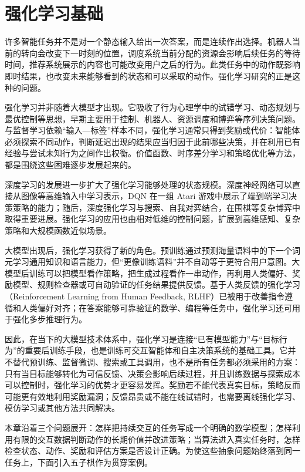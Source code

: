 
\chapter{强化学习基础}

许多智能任务并不是对一个静态输入给出一次答案，而是连续作出选择。机器人当前的转向会改变下一时刻的位置，调度系统当前分配的资源会影响后续任务的等待时间，推荐系统展示的内容也可能改变用户之后的行为。此类任务中的动作既影响即时结果，也改变未来能够看到的状态和可以采取的动作。强化学习研究的正是这种的问题。

强化学习并非随着大模型才出现。它吸收了行为心理学中的试错学习、动态规划与最优控制等思想，早期主要用于控制、机器人、资源调度和博弈等序列决策问题。与监督学习依赖“输入—标签”样本不同，强化学习通常只得到奖励或代价：智能体必须探索不同动作，判断延迟出现的结果应当归因于此前哪些决策，并在利用已有经验与尝试未知行为之间作出权衡。价值函数、时序差分学习和策略优化等方法，都是围绕这些困难逐步发展起来的。

深度学习的发展进一步扩大了强化学习能够处理的状态规模。深度神经网络可以直接从图像等高维输入中学习表示，DQN 在一组 Atari 游戏中展示了端到端学习决策策略的能力；随后，深度强化学习与搜索、自我对弈结合，在围棋等复杂博弈中取得重要进展。强化学习的应用也由相对低维的控制问题，扩展到高维感知、复杂策略和大规模函数近似场景。

大模型出现后，强化学习获得了新的角色。预训练通过预测海量语料中的下一个词元学习通用知识和语言能力，但“更像训练语料”并不自动等于更符合用户意图。大模型后训练可以把模型看作策略，把生成过程看作一串动作，再利用人类偏好、奖励模型、规则检查器或可自动验证的任务结果提供反馈。基于人类反馈的强化学习（Reinforcement Learning from Human Feedback, RLHF）已被用于改善指令遵循和人类偏好对齐；在答案能够可靠验证的数学、编程等任务中，强化学习还可用于强化多步推理行为。

因此，在当下的大模型技术体系中，强化学习是连接“已有模型能力”与“目标行为”的重要后训练手段，也是训练可交互智能体和自主决策系统的基础工具。它并不替代预训练、监督微调、搜索或工具调用，也不是所有任务都必须采用的方案：只有当目标能够转化为可信反馈、决策会影响后续过程，并且训练数据与探索成本可以控制时，强化学习的优势才更容易发挥。奖励若不能代表真实目标，策略反而可能更有效地利用奖励漏洞；反馈昂贵或不能在线试错时，也需要离线强化学习、模仿学习或其他方法共同解决。

本章沿着三个问题展开：怎样把持续交互的任务写成一个明确的数学模型；怎样利用有限的交互数据判断动作的长期价值并改进策略；当算法进入真实任务时，怎样检查状态、动作、奖励和评估方案是否设计正确。为使这些抽象问题始终落到同一任务上，下面引入五子棋作为贯穿案例。

